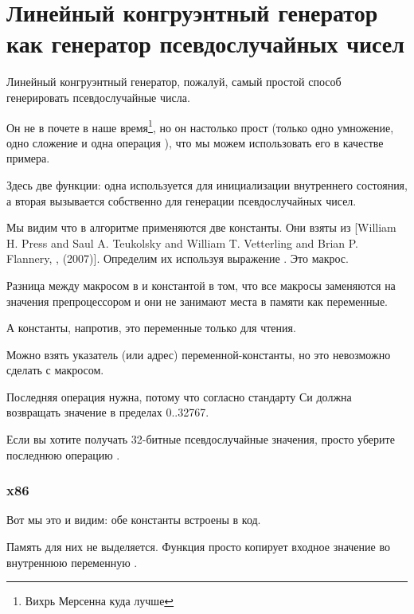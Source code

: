 \chapter[Линейный конгруэнтный генератор]{Линейный конгруэнтный генератор как генератор псевдослучайных чисел}
\label{LCG_simple}

Линейный конгруэнтный генератор, пожалуй, самый простой способ генерировать псевдослучайные числа.

Он не в почете в наше время\footnote{Вихрь Мерсенна куда лучше}, но он настолько прост
(только одно умножение, одно сложение и одна операция ),
что мы можем использовать его в качестве примера.



Здесь две функции: одна используется для инициализации внутреннего состояния, а вторая
вызывается собственно для генерации псевдослучайных чисел.

Мы видим что в алгоритме применяются две константы.
Они взяты из
[William H. Press and Saul A. Teukolsky and William T. Vetterling and Brian P. Flannery, , (2007)].
Определим их используя выражение \CCpp {}. Это макрос.

Разница между макросом в \CCpp и константой в том, что все макросы заменяются на значения препроцессором
\CCpp и они не занимают места в памяти как переменные.

А константы, напротив, это переменные только для чтения.

Можно взять указатель (или адрес) переменной-константы, но это невозможно сделать с макросом.

Последняя операция  нужна, потому что согласно стандарту Си  должна возвращать значение в пределах
0..32767.

Если вы хотите получать 32-битные псевдослучайные значения, просто уберите последнюю операцию .

\subsection{x86}



Вот мы это и видим: обе константы встроены в код.

Память для них не выделяется.
Функция  просто копирует входное значение во внутреннюю переменную .

